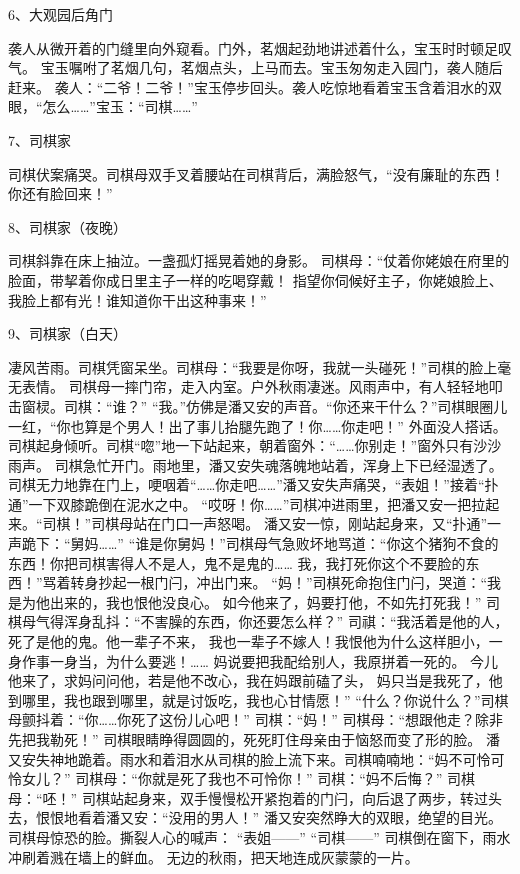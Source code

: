 6、大观园后角门\par
袭人从微开着的门缝里向外窥看。门外，茗烟起劲地讲述着什么，宝玉时时顿足叹气。
宝玉嘱咐了茗烟几句，茗烟点头，上马而去。宝玉匆匆走入园门，袭人随后赶来。
袭人：“二爷！二爷！”宝玉停步回头。袭人吃惊地看着宝玉含着泪水的双眼，“怎么……”宝玉：“司棋……”

7、司棋家\par
司棋伏案痛哭。司棋母双手叉着腰站在司棋背后，满脸怒气，“没有廉耻的东西！你还有脸回来！”

8、司棋家（夜晚）\par
司棋斜靠在床上抽泣。一盏孤灯摇晃着她的身影。
司棋母：“仗着你姥娘在府里的脸面，带挈着你成日里主子一样的吃喝穿戴！
指望你伺候好主子，你姥娘脸上、我脸上都有光！谁知道你干出这种事来！”

9、司棋家（白天）\par
凄风苦雨。司棋凭窗呆坐。司棋母：“我要是你呀，我就一头碰死！”司棋的脸上毫无表情。
司棋母一摔门帘，走入内室。户外秋雨凄迷。风雨声中，有人轻轻地叩击窗棂。司棋：“谁？”
“我。”仿佛是潘又安的声音。“你还来干什么？”司棋眼圈儿一红，“你也算是个男人！出了事儿抬腿先跑了！你……你走吧！”
外面没人搭话。司棋起身倾听。司棋“唿”地一下站起来，朝着窗外：“……你别走！”窗外只有沙沙雨声。
司棋急忙开门。雨地里，潘又安失魂落魄地站着，浑身上下已经湿透了。
司棋无力地靠在门上，哽咽着“……你走吧……”潘又安失声痛哭，“表姐！”接着“扑通”一下双膝跪倒在泥水之中。
“哎呀！你……”司棋冲进雨里，把潘又安一把拉起来。“司棋！”司棋母站在门口一声怒喝。
潘又安一惊，刚站起身来，又“扑通”一声跪下：“舅妈……”
“谁是你舅妈！”司棋母气急败坏地骂道：“你这个猪狗不食的东西！你把司棋害得人不是人，鬼不是鬼的……
我，我打死你这个不要脸的东西！”骂着转身抄起一根门闩，冲出门来。
“妈！”司棋死命抱住门闩，哭道：“我是为他出来的，我也恨他没良心。
如今他来了，妈要打他，不如先打死我！”
司棋母气得浑身乱抖：“不害臊的东西，你还要怎么样？”
司祺：“我活着是他的人，死了是他的鬼。他一辈子不来，
我也一辈子不嫁人！我恨他为什么这样胆小，一身作事一身当，为什么要逃！……
妈说要把我配给别人，我原拼着一死的。
今儿他来了，求妈问问他，若是他不改心，我在妈跟前磕了头，
妈只当是我死了，他到哪里，我也跟到哪里，就是讨饭吃，我也心甘情愿！”
“什么？你说什么？”司棋母颤抖着：“你……你死了这份儿心吧！”
司棋：“妈！”
司棋母：“想跟他走？除非先把我勒死！”
司棋眼睛睁得圆圆的，死死盯住母亲由于恼怒而变了形的脸。
潘又安失神地跪着。雨水和着泪水从司棋的脸上流下来。司棋喃喃地：“妈不可怜可怜女儿？”
司棋母：“你就是死了我也不可怜你！”
司棋：“妈不后悔？”
司棋母：“呸！”
司棋站起身来，双手慢慢松开紧抱着的门闩，向后退了两步，转过头去，恨恨地看着潘又安：“没用的男人！”
潘又安突然睁大的双眼，绝望的目光。司棋母惊恐的脸。撕裂人心的喊声：
“表姐——”
“司棋——”
司棋倒在窗下，雨水冲刷着溅在墙上的鲜血。
无边的秋雨，把天地连成灰蒙蒙的一片。

